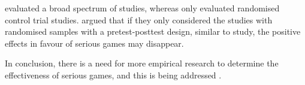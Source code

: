 \documentclass[a4paper,11.5pt]{report}
\numberwithin{figure}{section}
\numberwithin{table}{section}
\numberwithin{equation}{section}
\numberwithin{equation}{section}
\begin{document}
\citeauthor{Pieter2013} evaluated a broad spectrum of studies, whereas \citeauthor{Girard2013} only evaluated randomised control trial studies. \citeauthor{Pieter2013} argued that if they only considered the studies with randomised samples with a pretest-posttest design, similar to \citeauthor{Girard2013} study, the positive effects in favour of serious games may disappear. 

In conclusion, there is a need for more empirical research to determine the effectiveness of serious games, and this is being addressed \citep{Connolly2012}.












\end{document}
